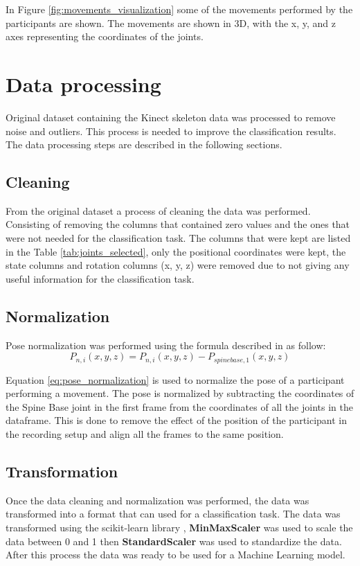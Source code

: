         In Figure \ref{fig:movements_visualization} some of the movements performed by the participants are shown. The movements are shown in 3D, with the x, y, and z axes representing the coordinates of the joints. 
    \section{Data processing}

        Original dataset containing the Kinect skeleton data was processed to remove noise and outliers. This process is needed to improve the classification results. The data processing steps are described in the following sections.
        
        \subsection{Cleaning}
        
        From the original dataset a process of cleaning the data was performed. Consisting of removing the columns that contained zero values and the ones that were not needed for the classification task. The columns that were kept are listed in the Table \ref{tab:joints_selected}, only the positional coordinates were kept, the state columns and rotation columns (x, y, z) were removed due to not giving any useful information for the classification task.

        \subsection{Normalization}

        Pose normalization was performed using the formula described in \cite{maudsley-barton_comparative_2017} as follow:
        \begin{equation}
            P_{n,i}(x,y,z) = P_{n,i}(x,y,z)-P_{spinebase,1}(x,y,z)
            \label{eq:pose_normalization}
        \end{equation}

        Equation \ref{eq:pose_normalization} is used to normalize the pose of a participant performing a movement. The pose is normalized by subtracting the coordinates of the Spine Base joint in the first frame from the coordinates of all the joints in the dataframe. This is done to remove the effect of the position of the participant in the recording setup and align all the frames to the same position. 

        \subsection{Transformation}

        Once the data cleaning and normalization was performed, the data was transformed into a format that can used for a classification task. The data was transformed using the scikit-learn library \cite{sklearn_api}, \textbf{MinMaxScaler} was used to scale the data between 0 and 1 then \textbf{StandardScaler} was used to standardize the data. After this process the data was ready to be used for a Machine Learning model.

\cleardoublepage